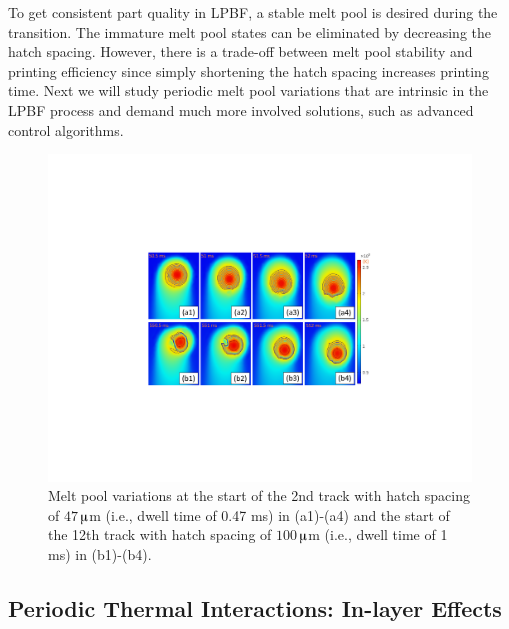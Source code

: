 \documentclass [11pt, proquest] {uwthesis}[2020/02/24]
\begin{document}
To get consistent part quality in LPBF, a stable melt pool is desired
during the transition. The immature melt pool states can be eliminated
by decreasing the hatch spacing. However, there is a trade-off between
melt pool stability and printing efficiency since simply shortening
the hatch spacing increases printing time. Next we will study periodic
melt pool variations that are intrinsic in the LPBF process and demand
much more involved solutions, such as advanced control algorithms.
\begin{figure}[!ht]
\begin{centering}
\includegraphics[clip,width=13cm]{Closed-loop-simulation/hatchspacing_smalllarge}
\par\end{centering}
\centering{}\caption{\label{fig:Melt-pool-variation}Melt pool variations at the start
of the 2nd track with hatch spacing of $47\,$$\muup$m (i.e., dwell
time of 0.47 ms) in (a1)-(a4) and the start of the 12th track with
hatch spacing of $100\,$$\muup$m (i.e., dwell time of 1 ms) in (b1)-(b4).}
\end{figure}

\subsection{Periodic Thermal Interactions: In-layer Effects} \label{subsec:In-layer-Effects}
\end{document}
